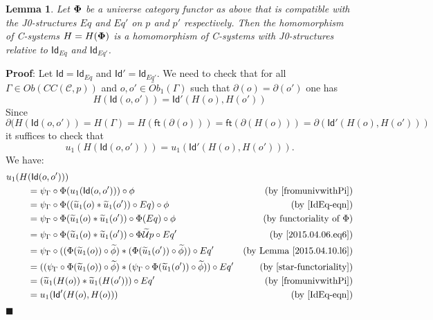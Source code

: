 \documentclass[12pt]{article}
\numberwithin{equation}{section}
\newenvironment{myproof}{{\bf Proof}:}{$\blacksquare$ \vskip 5mm }
\newtheorem{lemma}[proposition]{Lemma}
\newcommand{\by}[1]{\text{(by #1)}}
\newcommand{\wt}{\widetilde}
\newcommand{\toCC}{CC} %
\newcommand{\C}{{\mathcal C}}  %
\newcommand{\ft}{\mathsf{ft}}
\newcommand{\Id}{\mathsf{Id}} %
\newcommand{\U}{\mathcal{U}}
\newcommand{\Obwt}{\wt{Ob}}
\begin{document}
\begin{lemma}
\label{2015.04.12.l1} Let ${\bf\Phi}$ be a universe category functor as above
that is compatible with the J0-structures $Eq$ and $Eq'$ on $p$ and $p'$
respectively. Then the homomorphism of C-systems $H=H({\bf\Phi})$ is a
homomorphism of C-systems with J0-structures relative to $\Id_{Eq}$ and
$\Id_{Eq'}$.
\end{lemma}
%
\begin{myproof}
Let $\Id=\Id_{Eq}$ and $\Id'=\Id_{Eq'}$. We need to check that for all
$\Gamma\in Ob(\toCC({\C},p))$ and $o,o'\in \Obwt_1(\Gamma)$ such that
$\partial(o)=\partial(o')$ one has
%
$$H(\Id(o,o'))=\Id'(H(o),H(o'))$$
%
Since
%
$$\partial(H(\Id(o,o'))=H(\Gamma)=H(\ft(\partial(o)))=\ft(\partial(H(o)))=\partial(\Id'(H(o),H(o')))$$
%
it suffices to check that
%
$$u_1(H(\Id(o,o')))=u_1(\Id'(H(o),H(o'))).$$
%
We have:
%
\begin{align*}
  u_1(H&(\Id(o,o'))) \\
  & = \psi_{\Gamma}\circ\Phi(u_1(\Id(o,o')))\circ\phi & \by{\cite[Lemma 6.1(1)]{fromunivwithPi}} \\
  & = \psi_{\Gamma}\circ\Phi((\wt{u}_1(o)*\wt{u}_1(o'))\circ Eq)\circ\phi & \by{\ref{IdEq-eqn}} \\
  & = \psi_{\Gamma}\circ\Phi(\wt{u}_1(o)*\wt{u}_1(o'))\circ \Phi(Eq)\circ\phi & \by{functoriality of $\Phi$} \\
  & = \psi_{\Gamma}\circ\Phi(\wt{u}_1(o)*\wt{u}_1(o'))\circ \Phi\wt{\U}p\circ Eq' & \by{\ref{2015.04.06.eq6}} \\
  & = \psi_{\Gamma}\circ((\Phi(\wt{u}_1(o))\circ\wt{\phi})*(\Phi(\wt{u}_1(o'))\circ\wt{\phi}))\circ Eq' & \by{Lemma \ref{2015.04.10.l6}} \\
  & = ((\psi_{\Gamma}\circ\Phi(\wt{u}_1(o))\circ\wt{\phi})*(\psi_{\Gamma}\circ\Phi(\wt{u}_1(o'))\circ\wt{\phi}))\circ Eq' & \by{\ref{star-functoriality}} \\
  & = (\wt{u}_1(H(o))*\wt{u}_1(H(o')))\circ Eq' & \by{\cite[Lemma 6.1(2)]{fromunivwithPi}} \\
  & = u_1(\Id'(H(o),H(o))) & \by{\ref{IdEq-eqn}}
\end{align*}
\end{myproof}
\end{document}

